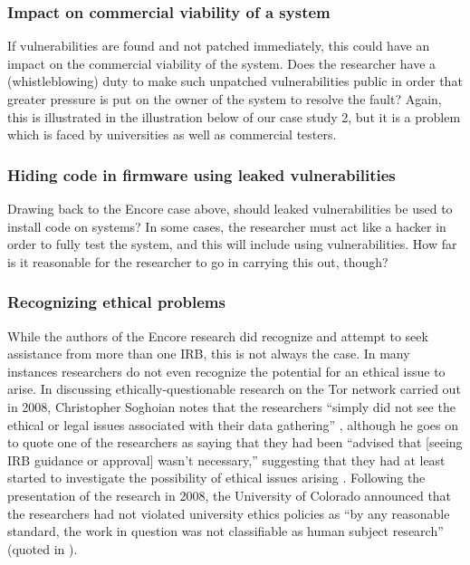 \documentclass{svjour3}                     %
\begin{document}
\subsubsection{Impact on commercial viability of a system}
If vulnerabilities are found and not patched immediately, this could have an impact on the commercial viability of the system.  Does the researcher have a (whistleblowing) duty to make such unpatched vulnerabilities public in order that greater pressure is put on the owner of the system to resolve the fault? Again, this is illustrated in the illustration below of our case study 2, but it is a problem which is faced by universities as well as commercial testers.

\subsubsection{Hiding code in firmware using leaked vulnerabilities}
Drawing back to the Encore case above, should leaked vulnerabilities be used to install code on systems? In some cases, the researcher must act like a hacker in order to fully test the system, and this will include using vulnerabilities. How far is it reasonable for the researcher to go in carrying this out, though?

\subsubsection{Recognizing ethical problems}
While the authors of the Encore research did recognize and attempt to seek assistance from more than one IRB, this is not always the case. In many instances researchers do not even recognize the potential for an ethical issue to arise. In discussing ethically-questionable research on the Tor network carried out in 2008, Christopher Soghoian notes that the researchers ``simply did not see the ethical or legal issues associated with their data gathering'' \cite[p.~146]{soghoian2011enforced}, although he goes on to quote one of the researchers as saying that they had been ``advised that [seeing IRB guidance or approval] wasn’t necessary,'' suggesting that they had at least started to investigate the possibility of ethical issues arising \cite[p.~147]{soghoian2011enforced}. Following the presentation of the research in 2008, the University of Colorado announced that the researchers had not violated university ethics policies as ``by any reasonable standard, the work in question was not classifiable as human subject research'' (quoted in \cite{soghoian2011enforced}).
\end{document}
